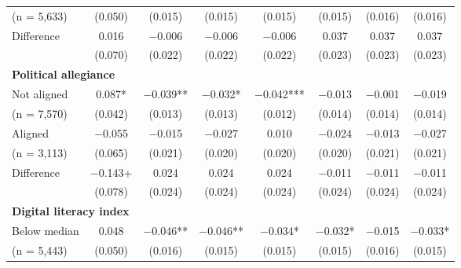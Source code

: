 \documentclass[letterpaper, 12pt, parskip=full,DIV=10]{scrartcl}
\begin{document}
\begin{table}[H]
{\begin{tabular}{lccccccc}
\hspace{1.5em}  (n = 5,633)	&	(\num{0.050})	&	(\num{0.015})	&	(\num{0.015})	&	(\num{0.015})	&	(\num{0.015})	&	(\num{0.016})	&	(\num{0.016})\\
\cmidrule(lr){2-8}														
\hspace{1em} Difference	&	\num{0.016}	&	\num{-0.006}	&	\num{-0.006}	&	\num{-0.006}	&	\num{0.037}	&	\num{0.037}	&	\num{0.037}\\
\hspace{1.5em}	&	(\num{0.070})	&	(\num{0.022})	&	(\num{0.022})	&	(\num{0.022})	&	(\num{0.023})	&	(\num{0.023})	&	(\num{0.023})\\
\multicolumn{4}{l}{\textbf{Political allegiance}} \rule{0pt}{1.2\normalbaselineskip}\\														
\hspace{1em} Not aligned	&	\num{0.087}*	&	\num{-0.039}**	&	\num{-0.032}*	&	\num{-0.042}***	&	\num{-0.013}	&	\num{-0.001}	&	\num{-0.019}\\
\hspace{1.5em} (n = 7,570)	&	(\num{0.042})	&	(\num{0.013})	&	(\num{0.013})	&	(\num{0.012})	&	(\num{0.014})	&	(\num{0.014})	&	(\num{0.014})\\
\hspace{1em} Aligned	&	\num{-0.055}	&	\num{-0.015}	&	\num{-0.027}	&	\num{0.010}	&	\num{-0.024}	&	\num{-0.013}	&	\num{-0.027}\\
\hspace{1.5em} (n = 3,113)	&	(\num{0.065})	&	(\num{0.021})	&	(\num{0.020})	&	(\num{0.020})	&	(\num{0.020})	&	(\num{0.021})	&	(\num{0.021})\\
\cmidrule(lr){2-8}														
\hspace{1em} Difference	&	\num{-0.143}+	&	\num{0.024}	&	\num{0.024}	&	\num{0.024}	&	\num{-0.011}	&	\num{-0.011}	&	\num{-0.011}\\
\hspace{1.5em}	&	(\num{0.078})	&	(\num{0.024})	&	(\num{0.024})	&	(\num{0.024})	&	(\num{0.024})	&	(\num{0.024})	&	(\num{0.024})\\
\multicolumn{4}{l}{\textbf{Digital literacy index }}  \rule{0pt}{1.2\normalbaselineskip}\\														
\hspace{1em} Below median	&	\num{0.048}	&	\num{-0.046}**	&	\num{-0.046}**	&	\num{-0.034}*	&	\num{-0.032}*	&	\num{-0.015}	&	\num{-0.033}*\\
\hspace{1.5em}  (n = 5,443)	&	(\num{0.050})	&	(\num{0.016})	&	(\num{0.015})	&	(\num{0.015})	&	(\num{0.015})	&	(\num{0.016})	&	(\num{0.015})\\

\end{tabular}}
\end{table}
\end{document}
